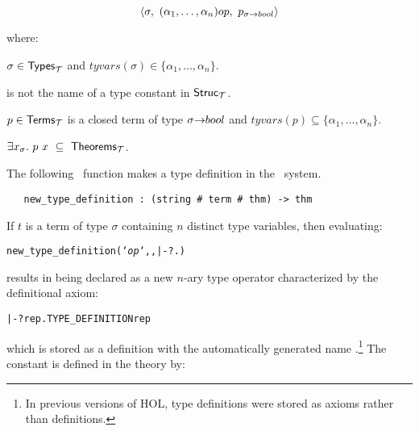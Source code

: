 {\[ \langle \sigma,\ (\alpha_1,\ldots,\alpha_n)\ty{op},
    \ p_{\sigma\fun\ty{bool}}\rangle \]

\noindent where:

\begin{myenumerate}
\item $\sigma\in{\sf Types}_{\cal T}$  and
$tyvars(\sigma)\in\{\alpha_1, \ldots , \alpha_n\}$.
\item {} is not the name of a type constant in ${\sf Struc}_{\cal T}$.
\item $p\in{\sf Terms}_{\cal T}$ is a closed term of
type $\sigma{\to}{\sl bool}$  and
$tyvars(p)\subseteq\{\alpha_1, \ldots , \alpha_n\}$.
\item $\exists x_{\sigma}.\ p\ x \ \subseteq\ {\sf Theorems}_{\cal T}$.
\end{myenumerate}

The following \ML\ function makes a type definition in the \HOL\ system.

\begin{boxed}
\begin{verbatim}
   new_type_definition : (string # term # thm) -> thm
\end{verbatim}\end{boxed}

\noindent If $t$ is a term of type
$\sigma$ containing $n$ distinct type variables, then
evaluating:

{\def\op{{\normalsize\sl op}}
\begin{hol}\begin{alltt}
   new_type_definition(`{\op}`, , |- ?.) 
\end{alltt}\end{hol}}

\noindent results in  being declared as a new $n$-ary type operator
characterized by the definitional axiom:

\begin{hol}\begin{alltt}
   |- ?rep. TYPE\_DEFINITION  rep
\end{alltt}\end{hol}

\noindent which is stored as a definition with the automatically 
generated name
.\footnote{In 
previous versions of HOL, type definitions 
were stored as axioms rather than definitions.} The constant 
is defined in the theory  by:

}
